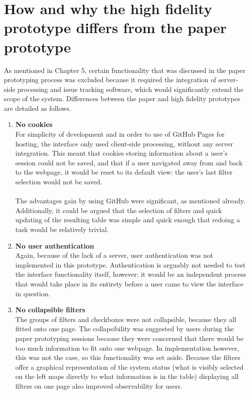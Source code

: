 \section{How and why the high fidelity prototype differs from the paper prototype}
As mentioned in Chapter 5, certain functionality that was discussed in the paper prototyping process was excluded because it required the integration of server-side processing and issue tracking software, which would significantly extend the scope of the system. Differences between the paper and high fidelity prototypes are detailed as follows. 
\begin{enumerate}
 \item \textbf{No cookies}\\
For simplicity of development and in order to use of GitHub Pages for hosting, the interface only used client-side processing, without any server integration. This meant that cookies storing information about a user's session could not be saved, and that if a user navigated away from and back to the webpage, it would be reset to its default view: the user's last filter selection would not be saved. \\
\\
The advantages gain by using GitHub were significant, as mentioned already. Additionally, it could be argued that the selection of filters and quick updating of the resulting table was simple and quick enough that redoing a task would be relatively trivial. 

\item \textbf{No user authentication}\\
Again, because of the lack of a server, user authentication was not implemented in this prototype. Authentication is arguably not needed to test the interface functionality itself, however: it would be an independent process that would take place in its entirety before a user came to view the interface in question. 

\item \textbf{No collapsible filters}\\
The groups of filters and checkboxes were not collapsible, because they all fitted onto one page. The collapsibility was suggested by users during the paper prototyping sessions because they were concerned that there would be too much information to fit onto one webpage. In implementation however, this was not the case, so this functionality was set aside. Because the filters offer a graphical representation of the system status (what is visibly selected on the left maps directly to what information is in the table) displaying all filters on one page also improved observability \citep[p. 270]{DixFinlay} for users.


\end{enumerate}
